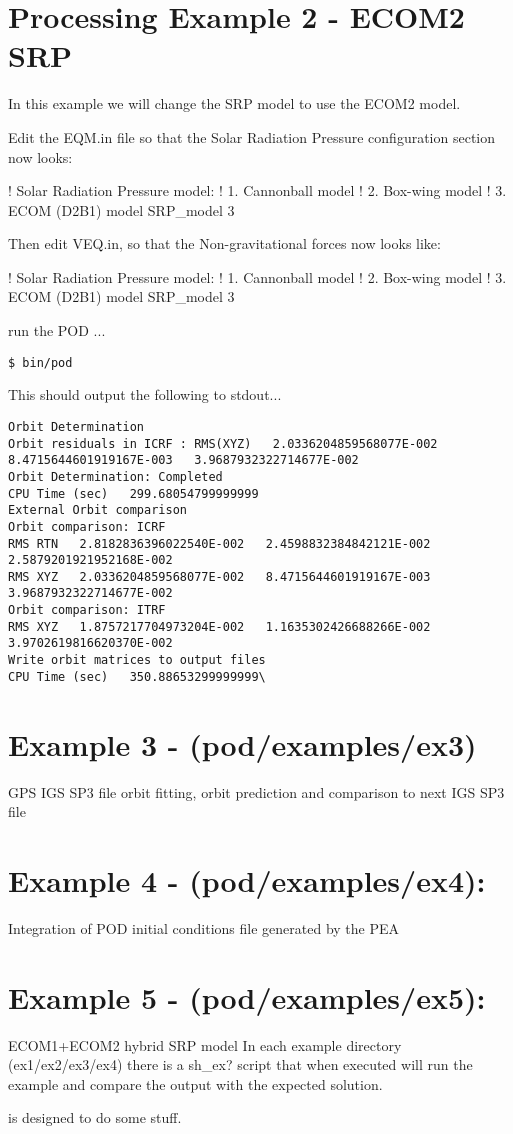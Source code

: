 \section{Processing Example 2 - ECOM2 SRP}
In this example we will change the SRP model to use the ECOM2 model.

Edit the EQM.in file so that the Solar Radiation Pressure configuration section now looks:

! Solar Radiation Pressure model: ! 1. Cannonball model ! 2. Box-wing model ! 3. ECOM (D2B1) model SRP\_model 3

Then edit VEQ.in, so that the Non-gravitational forces now looks like:


! Solar Radiation Pressure model: ! 1. Cannonball model ! 2. Box-wing model ! 3. ECOM (D2B1) model SRP\_model 3

run the POD ...

\begin{lstlisting}
$ bin/pod
\end{lstlisting}
This should output the following to stdout...
\begin{lstlisting}
Orbit Determination
Orbit residuals in ICRF : RMS(XYZ)   2.0336204859568077E-002   8.4715644601919167E-003   3.9687932322714677E-002
Orbit Determination: Completed
CPU Time (sec)   299.68054799999999
External Orbit comparison
Orbit comparison: ICRF
RMS RTN   2.8182836396022540E-002   2.4598832384842121E-002   2.5879201921952168E-002
RMS XYZ   2.0336204859568077E-002   8.4715644601919167E-003   3.9687932322714677E-002
Orbit comparison: ITRF
RMS XYZ   1.8757217704973204E-002   1.1635302426688266E-002   3.9702619816620370E-002
Write orbit matrices to output files
CPU Time (sec)   350.88653299999999\
\end{lstlisting}

\section{Example 3 - (pod/examples/ex3)}
GPS IGS SP3 file orbit fitting, orbit prediction and comparison to next IGS SP3 file

\section{Example 4 - (pod/examples/ex4):}
Integration of POD initial conditions file generated by the PEA

\section{Example 5 - (pod/examples/ex5):}
ECOM1+ECOM2 hybrid SRP model
In each example directory (ex1/ex2/ex3/ex4) there is a sh\_ex? script that when executed will run the example and compare the output with the expected solution.

 is designed to do some stuff.